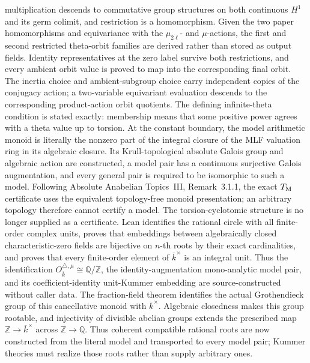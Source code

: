 \begin{definition}
  multiplication descends to commutative group structures on both continuous
  \(H^1\) and its germ colimit, and restriction is a homomorphism.  Given the
  two paper homomorphisms and
  equivariance with the \(\mu_{2\ell}\)- and \(\mu\)-actions, the first and
  second restricted theta-orbit families are derived rather than stored as
  output fields.  Identity representatives at the zero label survive both
  restrictions, and every ambient orbit value is proved to map into the
  corresponding final orbit.  The inertia choice and ambient-subgroup choice carry
  independent copies of the conjugacy action; a two-variable equivariant
  evaluation descends to the corresponding product-action orbit quotients.
  The defining infinite-theta condition is stated exactly: membership means
  that some positive power agrees with a theta value up to torsion.  At the
  constant boundary, the model arithmetic monoid is literally the nonzero
  part of the integral closure of the MLF valuation ring in its algebraic
  closure.  Its Krull-topological absolute Galois group and algebraic action
  are constructed, a model pair has a continuous surjective Galois
  augmentation, and every general pair is required to be isomorphic to such
  a model.  Following Absolute Anabelian Topics~III, Remark~3.1.1, the exact
  \(T_{\rm M}\) certificate uses the equivalent topology-free monoid
  presentation; an arbitrary topology therefore cannot certify a model.
  The torsion-cyclotomic structure is no longer supplied as a certificate.
  Lean identifies the rational circle with all finite-order complex units,
  proves that embeddings between algebraically closed characteristic-zero
  fields are bijective on \(n\)-th roots by their exact cardinalities, and
  proves that every finite-order element of
  \(\overline{k}^{\times}\) is an integral unit.  Thus the identification
  \(O_{\overline{k}}^{\triangle,\mu}\cong\mathbb Q/\mathbb Z\), the
  identity-augmentation mono-analytic model pair, and its coefficient-identity
  unit-Kummer embedding are source-constructed without caller data.
  The fraction-field theorem identifies the actual Grothendieck group of this
  cancellative monoid with \(\overline{k}^{\times}\).  Algebraic closedness
  makes this group rootable, and injectivity of divisible abelian groups
  extends the prescribed map \(\mathbb Z\to\overline{k}^{\times}\) across
  \(\mathbb Z\to\mathbb Q\).  Thus coherent compatible rational roots are
  now constructed from the literal model and transported to every model pair;
  Kummer theories must realize those roots rather than supply arbitrary ones.

\end{definition}
